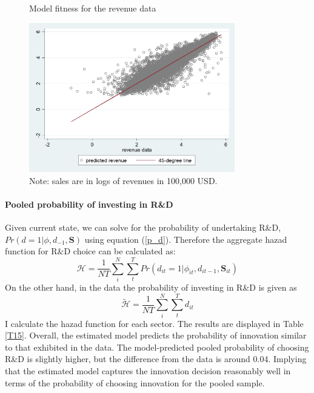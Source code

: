 \documentclass[English]{article}
\begin{document}
\begin{center}
\begin{figure}[H]
\caption{Model fitness for the revenue data}
\label{F3}
\begin{centering}
\includegraphics[width=0.8\textwidth]{revenue.png}
\par\end{centering}
\caption*{\small{}Note: sales are in logs of revenues in 100,000 USD.}{\small \par}
\end{figure}
\par\end{center}

\paragraph{Pooled probability of investing in R\&D}
Given current state, we can solve for the probability of undertaking R\&D,$Pr(d=1|\phi,d_{-1},\mathbf{S})$ using equation (\ref{p_d}). Therefore the aggregate hazad function for R\&D choice can be calculated as:
\begin{equation}\label{hazad}
\mathcal{H}=\frac{1}{NT}\sum_{i}^{N}\sum_{t}^{T} Pr(d_{it}=1|\phi_{it},d_{it-1},\mathbf{S}_{it})
\end{equation}
On the other hand, in the data the probability of investing in R\&D is given as
\begin{equation}
\tilde {\mathcal{H}}=\frac{1}{NT}\sum_{i}^{N}\sum_{t}^{T} d_{it}
\end{equation}
I calculate the hazad function for each sector. The results are displayed in Table \ref{T15}. Overall, the estimated model predicts the probability of innovation similar to that exhibited in the data. The model-predicted pooled probability of choosing R\&D is slightly higher, but the difference from the data is around 0.04. Implying that the estimated model captures the innovation decision reasonably well in terms of the probability of choosing innovation for the pooled sample. 
\end{document}
